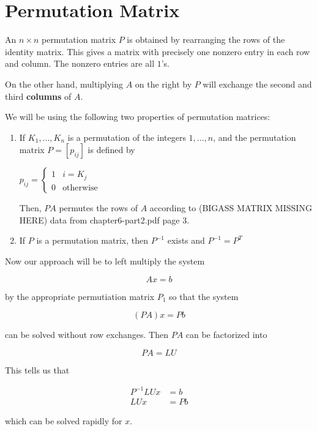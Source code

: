 \documentclass[12pt]{article}
\begin{document}
\section{Permutation Matrix}

An $n\times n$ permutation matrix $P$ is obtained by rearranging the rows of
the identity matrix. This gives a matrix with precisely one nonzero entry in
each row and column. The nonzero entries are all $1$'s.

On the other hand, multiplying $A$ on the right by $P$ will exchange the
second and third \textbf{columns} of $A$.

We will be using the following two properties of permutation matrices:

\begin{enumerate}
  \item If $K_1,...,K_n$ is a permutation of the integers $1,...,n$, and the
    permutation matrix $P=[p_{ij}]$ is defined by 

    \qquad $p_{ij}=\begin{cases}
      1 & i=K_j\\
      0 & \text{otherwise}
    \end{cases}$

    Then, $PA$ permutes the rows of $A$ according to (BIGASS MATRIX MISSING HERE)
    data from chapter6-part2.pdf page 3.
  \item If $P$ is a permutation matrix, then $P^{-1}$ exists and $P^{-1}=P^T$
\end{enumerate}

Now our approach will be to left multiply the system

\begin{equation*}
  Ax=b
\end{equation*}

by the appropriate permutiation matrix $P_1$ so that the system

\begin{equation*}
  (PA)x=Pb
\end{equation*}

can be solved without row exchanges. Then $PA$ can be factorized into

\begin{equation*}
  PA=LU
\end{equation*}

This tells us that

\begin{align*}
  P^{-1}LUx &= b \\
  LUx &= Pb
\end{align*}

which can be solved rapidly for $x$.
\end{document}
